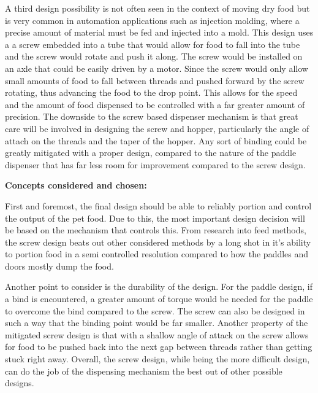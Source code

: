 \documentclass[12pt]{article}
\begin{document}
A third design possibility is not often seen in the context of moving dry food but is very common in automation applications such as injection molding, where a precise amount of material must be fed and injected into a mold. This design uses a a screw embedded into a tube that would allow for food to fall into the tube and the screw would rotate and push it along. The screw would be installed on an axle that could be easily driven by a motor. Since the screw would only allow small amounts of food to fall between threads and pushed forward by the screw rotating, thus advancing the food to the drop point. This allows for the speed and the amount of food dispensed to be controlled with a far greater amount of precision. The downside to the screw based dispenser mechanism is that great care will be involved in designing the screw and hopper, particularly the angle of attach on the threads and the taper of the hopper. Any sort of binding could be greatly mitigated with a proper design, compared to the nature of the paddle dispenser that has far less room for improvement compared to the screw design.

\textbf{Concepts considered and chosen:}

First and foremost, the final design should be able to reliably portion and control the output of the pet food. Due to this, the most important design decision will be based on the mechanism that controls this. From research into feed methods, the screw design beats out other considered methods by a long shot in it’s ability to portion food in a semi controlled resolution compared to how the paddles and doors mostly dump the food.

Another point to consider is the durability of the design. For the paddle design, if a bind is encountered, a greater amount of torque would be needed for the paddle to overcome the bind compared to the screw. The screw can also be designed in such a way that the binding point would be far smaller. Another property of the mitigated screw design is that with a shallow angle of attack on the screw allows for food to be pushed back into the next gap between threads rather than getting stuck right away. Overall, the screw design, while being the more difficult design, can do the job of the dispensing mechanism the best out of other possible designs.
\end{document}
